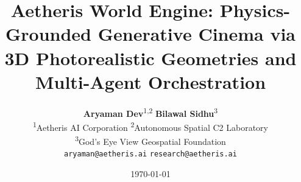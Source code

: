 \documentclass[10pt,twocolumn,letterpaper]{article}
\begin{document}
\title{\textbf{Aetheris World Engine: Physics-Grounded Generative Cinema via 3D Photorealistic Geometries and Multi-Agent Orchestration}}

\author{
  \textbf{Aryaman Dev}\textsuperscript{1,2} \qquad \textbf{Bilawal Sidhu}\textsuperscript{3} \\
  \textsuperscript{1}Aetheris AI Corporation \quad \textsuperscript{2}Autonomous Spatial C2 Laboratory \\
  \textsuperscript{3}God's Eye View Geospatial Foundation \\
  \texttt{aryaman@aetheris.ai} \qquad \texttt{research@aetheris.ai}
}

\date{\today}

\maketitle
\end{document}
